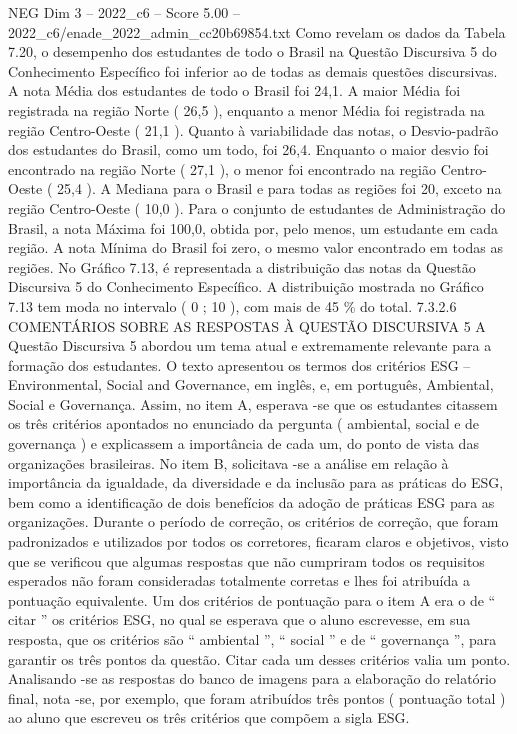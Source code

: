 \begin{textsample}{NEG Dim 3 – 2022\_c6 – Score 5.00 – 2022\_c6/enade\_2022\_admin\_cc20b69854.txt}
Como revelam os dados da Tabela 7.20, o desempenho dos estudantes de todo o Brasil na Questão Discursiva 5 do Conhecimento Específico foi inferior ao de todas as demais questões discursivas.
A nota Média dos estudantes de todo o Brasil foi 24,1.
A maior Média foi registrada na região Norte ( 26,5 ), enquanto a menor Média foi registrada na região Centro-Oeste ( 21,1 ).
Quanto à variabilidade das notas, o Desvio-padrão dos estudantes do Brasil, como um todo, foi 26,4.
Enquanto o maior desvio foi encontrado na região Norte ( 27,1 ), o menor foi encontrado na região Centro-Oeste ( 25,4 ).
A Mediana para o Brasil e para todas as regiões foi 20, exceto na região Centro-Oeste ( 10,0 ).
Para o conjunto de estudantes de Administração do Brasil, a nota Máxima foi 100,0, obtida por, pelo menos, um estudante em cada região.
A nota Mínima do Brasil foi zero, o mesmo valor encontrado em todas as regiões.
No Gráfico 7.13, é representada a distribuição das notas da Questão Discursiva 5 do Conhecimento Específico.
A distribuição mostrada no Gráfico 7.13 tem moda no intervalo ( 0 ; 10 ), com mais de 45 \% do total. 7.3.2.6 COMENTÁRIOS SOBRE AS RESPOSTAS À QUESTÃO DISCURSIVA 5 A Questão Discursiva 5 abordou um tema atual e extremamente relevante para a formação dos estudantes.
O texto apresentou os termos dos critérios ESG – Environmental, Social and Governance, em inglês, e, em português, Ambiental, Social e Governança.
Assim, no item A, esperava -se que os estudantes citassem os três critérios apontados no enunciado da pergunta ( ambiental, social e de governança ) e explicassem a importância de cada um, do ponto de vista das organizações brasileiras.
No item B, solicitava -se a análise em relação à importância da igualdade, da diversidade e da inclusão para as práticas do ESG, bem como a identificação de dois benefícios da adoção de práticas ESG para as organizações.
Durante o período de correção, os critérios de correção, que foram padronizados e utilizados por todos os corretores, ficaram claros e objetivos, visto que se verificou que algumas respostas que não cumpriram todos os requisitos esperados não foram consideradas totalmente corretas e lhes foi atribuída a pontuação equivalente.
Um dos critérios de pontuação para o item A era o de “ citar ” os critérios ESG, no qual se esperava que o aluno escrevesse, em sua resposta, que os critérios são “ ambiental ”, “ social ” e de “ governança ”, para garantir os três pontos da questão.
Citar cada um desses critérios valia um ponto.
Analisando -se as respostas do banco de imagens para a elaboração do relatório final, nota -se, por exemplo, que foram atribuídos três pontos ( pontuação total ) ao aluno que escreveu os três critérios que compõem a sigla ESG.

\end{textsample}
